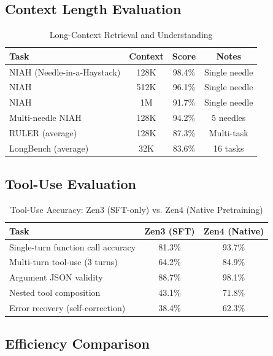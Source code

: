 \documentclass[11pt,a4paper]{article}
\begin{document}
\subsection{Context Length Evaluation}

\begin{table}[H]
\centering
\begin{tabular}{lccc}
\toprule
\textbf{Task} & \textbf{Context} & \textbf{Score} & \textbf{Notes} \\
\midrule
NIAH (Needle-in-a-Haystack) & 128K  & 98.4\% & Single needle \\
NIAH                        & 512K  & 96.1\% & Single needle \\
NIAH                        & 1M    & 91.7\% & Single needle \\
Multi-needle NIAH            & 128K  & 94.2\% & 5 needles \\
RULER (average)             & 128K  & 87.3\% & Multi-task \\
LongBench (average)         & 32K   & 83.6\% & 16 tasks \\
\bottomrule
\end{tabular}
\caption{Long-Context Retrieval and Understanding}
\end{table}

\subsection{Tool-Use Evaluation}

\begin{table}[H]
\centering
\begin{tabular}{lcc}
\toprule
\textbf{Task} & \textbf{Zen3 (SFT)} & \textbf{Zen4 (Native)} \\
\midrule
Single-turn function call accuracy & 81.3\% & 93.7\% \\
Multi-turn tool-use (3 turns)      & 64.2\% & 84.9\% \\
Argument JSON validity             & 88.7\% & 98.1\% \\
Nested tool composition            & 43.1\% & 71.8\% \\
Error recovery (self-correction)   & 38.4\% & 62.3\% \\
\bottomrule
\end{tabular}
\caption{Tool-Use Accuracy: Zen3 (SFT-only) vs. Zen4 (Native Pretraining)}
\end{table}

\subsection{Efficiency Comparison}
\end{document}
